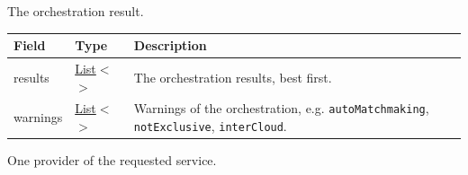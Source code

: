 \documentclass[a4paper]{arrowhead}
\newcommand{\mref}[2][]{{\textcolor{ArrowheadPurple}{\hyperref[sec:model:#2]{\ifstrempty{#1}{#2}{#1}}}}}
\newcommand{\pref}[1]{{\textcolor{ArrowheadGrey}{\hyperref[sec:model:primitives:#1]{#1}}}}
\begin{document}

The orchestration result.


\noindent\begin{tabularx}{\textwidth}{| >{\raggedright\arraybackslash}p{3.9cm} | >{\raggedright\arraybackslash\small}p{5.3cm} | X |} \hline
\rowcolor{gray!33} Field & Type & Description \\ \hline
results & \pref{List}$<$\allowbreak{}\mref{OrchestrationResult}$>$ & The orchestration results, best first. \\ \hline
warnings & \pref{List}$<$\allowbreak{}\pref{String}$>$ & Warnings of the orchestration, e.g. \texttt{autoMatchmaking}, \texttt{notExclusive}, \texttt{interCloud}. \\ \hline
\end{tabularx}




One provider of the requested service.
\end{document}

